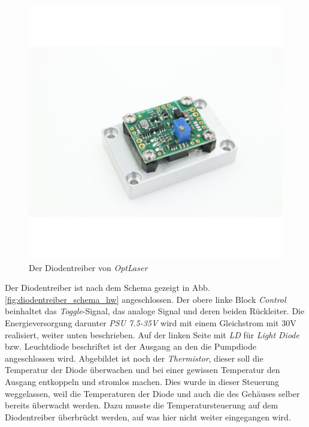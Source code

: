 \begin{figure}[H]
    \centering
    \includegraphics[scale=1, trim={25mm 20mm 15mm 30mm}, clip]{98_images/ldd_optlaser.jpg}
    \caption{Der Diodentreiber von \textit{OptLaser}}
    \label{fig:diodentreiber_hw}
\end{figure}

Der Diodentreiber ist nach dem Schema gezeigt in Abb. \ref{fig:diodentreiber_schema_hw} angeschlossen. Der obere linke Block \textit{Control} beinhaltet das \textit{Toggle}-Signal, das analoge Signal und deren beiden Rückleiter. Die Energieversorgung darunter \textit{PSU 7.5-35V} wird mit einem Gleichstrom mit 30V realisiert, weiter unten beschrieben. Auf der linken Seite mit \textit{LD} für \textit{Light Diode}  bzw. Leuchtdiode beschriftet ist der Ausgang an den die Pumpdiode angeschlossen wird. Abgebildet ist noch der \textit{Thermistor}, dieser soll die Temperatur der Diode überwachen und bei einer gewissen Temperatur den Ausgang entkoppeln und stromlos machen. Dies wurde in dieser Steuerung weggelassen, weil die Temperaturen der Diode und auch die des Gehäuses selber bereits überwacht werden. Dazu musste die Temperatursteuerung auf dem Diodentreiber überbrückt werden, auf was hier nicht weiter eingegangen wird.


